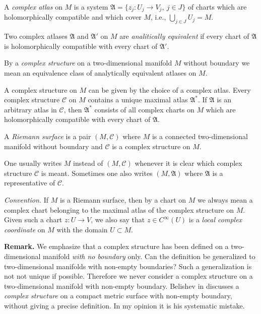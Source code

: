 \documentclass[12pt,reqno]{amsart}
\begin{document}
A {\it complex atlas} on $M$ is a system $\mathfrak{A}=\{ z_j:U_j\to V_j,\ j\in J\}$ of charts which are holomorphically compatible and which cover $M$, i.e., $\bigcup_{j\in J}U_j=M$.

Two complex atlases $\mathfrak{A}$ and ${\mathfrak A}'$ on $M$ are {\it analitically equivalent} if every chart of $\mathfrak{A}$ is holomorphically compatible with every chart of ${\mathfrak A}'$.

\begin{definition}
{\rm By a {\it complex structure} on a two-dimensional manifold $M$ without boundary we mean an equivalence class of analytically equivalent atlases on $M$.}
\end{definition}

A complex structure on $M$ can be given by the choice of a complex atlas. Every complex structure ${\mathcal C}$ on $M$ contains a unique maximal atlas $\mathfrak{A}^*$. If $\mathfrak{A}$ is an arbitrary atlas in ${\mathcal C}$, then $\mathfrak{A}^*$ consists of all complex charts on $M$ which are holomorphically compatible with every chart of $\mathfrak{A}$.

\begin{definition}
{\rm A {\it Riemann surface} is a pair $(M,{\mathcal C})$ where $M$ is a connected two-di\-men\-sio\-nal manifold without boundary and ${\mathcal C}$ is a complex structure on $M$.}
\end{definition}

One usually writes $M$ instead of $(M,{\mathcal C})$ whenever it is clear which complex structure ${\mathcal C}$ is meant. Sometimes one also writes $(M,{\mathfrak A})$ where ${\mathfrak A}$ is a representative of ${\mathcal C}$.

{\it Convention.} If $M$ is a Riemann surface, then by a chart on $M$ we always mean a complex chart belonging to the maximal atlas of the complex structure on $M$. Given such a chart $z:U\to V$, we also say that $z\in C^\infty(U)$ is a {\it local complex coordinate} on $M$ with the domain $U\subset M$.

\medskip

{\bf Remark.}
We emphasize that a complex structure has been defined on a two-dimen\-si\-on\-al manifold {\it with no boundary} only. Can the definition be generalized to two-dimensional manifolds with non-empty boundaries? Such a generalization is not not unique if possible. Therefore we never consider  a complex structure on a two-dimensional manifold with non-empty boundary.
Belishev in \cite{Be} discusses a {\it complex structure} on a compact metric surface with non-empty boundary, without giving a precise definition. In my opinion it is his systematic mistake.
\end{document}
